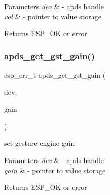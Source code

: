 \begin{DoxyParams}{Parameters}
{\em dev} & -\/ apds handle \\
\hline
{\em val} & -\/ pointer to value storage \\
\hline
\end{DoxyParams}
\begin{DoxyReturn}{Returns}
E\+S\+P\+\_\+\+OK or error 
\end{DoxyReturn}
\mbox{\label{group__APDS9960__GestureFunctions_ga6d460e4b59df3406d2630463df4c3fc2}} 
\subsubsection{\texorpdfstring{apds\+\_\+get\+\_\+gst\+\_\+gain()}{apds\_get\_gst\_gain()}}
{\footnotesize\ttfamily esp\+\_\+err\+\_\+t apds\+\_\+get\+\_\+gst\+\_\+gain (\begin{DoxyParamCaption}\item[{\hyperlink{structAPDS9960__Driver}{A\+P\+D\+S\+\_\+\+D\+EV}}]{dev,  }\item[{\hyperlink{vl53l0x__types_8h_aba7bc1797add20fe3efdf37ced1182c5}{uint8\+\_\+t} $\ast$}]{gain }\end{DoxyParamCaption})}




\begin{DoxyItemize}
\item set gesture engine gain 
\end{DoxyItemize}


\begin{DoxyParams}{Parameters}
{\em dev} & -\/ apds handle \\
\hline
{\em gain} & -\/ pointer to value storage \\
\hline
\end{DoxyParams}
\begin{DoxyReturn}{Returns}
E\+S\+P\+\_\+\+OK or error 
\end{DoxyReturn}
\mbox{\label{group__APDS9960__GestureFunctions_ga63ac7b590416a14f49b7bcfd463b8017}} 
